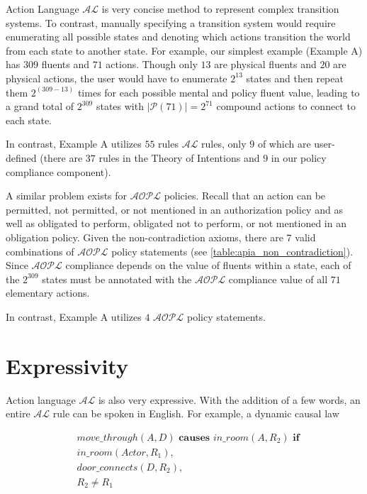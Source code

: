 Action Language $\mathcal{AL}$ is very concise method to represent complex transition systems.
To contrast, manually specifying a transition system would require enumerating all possible states and denoting which actions transition the world from each state to another state.
For example, our simplest example (Example A) has $309$ fluents and $71$ actions.
Though only $13$ are physical fluents and $20$ are physical actions, the user would have to enumerate $2^{13}$ states and then repeat them $2^{(309-13)}$ times for each possible mental and policy fluent value, leading to a grand total of $2^{309}$ states with $|\mathcal{P}(71)|=2^{71}$ compound actions to connect to each state.

In contrast, Example A utilizes $55$ rules $\mathcal{AL}$ rules, only $9$ of which are user-defined (there are $37$ rules in the Theory of Intentions and $9$ in our policy compliance component).

A similar problem exists for $\mathcal{AOPL}$ policies.
Recall that an action can be permitted, not permitted, or not mentioned in an authorization policy and as well as obligated to perform, obligated not to perform, or not mentioned in an obligation policy.
Given the non-contradiction axioms, there are $7$ valid combinations of $\mathcal{AOPL}$ policy statements (see \cref{table:apia_non_contradiction}).
Since $\mathcal{AOPL}$ compliance depends on the value of fluents within a state, each of the $2^{309}$ states must be annotated with the $\mathcal{AOPL}$ compliance value of all $71$ elementary actions.

In contrast, Example A utilizes $4$ $\mathcal{AOPL}$ policy statements.

\section{Expressivity}

Action language $\mathcal{AL}$ is also very expressive.
With the addition of a few words, an entire $\mathcal{AL}$ rule can be spoken in English.
For example, a dynamic causal law

\begin{equation}
\begin{split}
    & move\_through(A, D) \textbf{ causes } in\_room(A, R_{2}) \textbf{ if} \\
    & in\_room(Actor, R_{1}), \\
    & door\_connects(D, R_{2}), \\
    & R_{2} \neq R_{1}
\end{split}
\end{equation}

